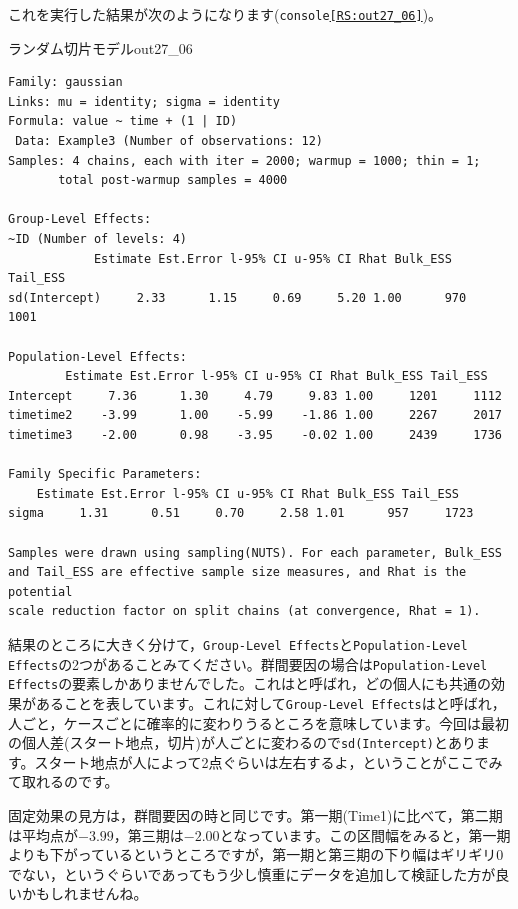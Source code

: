 \documentclass{ltjsarticle}
\begin{document}
これを実行した結果が次のようになります(\texttt{console\ref{RS:out27_06}})。
\begin{Rscreen}{ランダム切片モデル}{out27_06}
	\begin{verbatim}
Family: gaussian 
Links: mu = identity; sigma = identity 
Formula: value ~ time + (1 | ID) 
 Data: Example3 (Number of observations: 12) 
Samples: 4 chains, each with iter = 2000; warmup = 1000; thin = 1;
       total post-warmup samples = 4000

Group-Level Effects: 
~ID (Number of levels: 4) 
            Estimate Est.Error l-95% CI u-95% CI Rhat Bulk_ESS Tail_ESS
sd(Intercept)     2.33      1.15     0.69     5.20 1.00      970     1001

Population-Level Effects: 
        Estimate Est.Error l-95% CI u-95% CI Rhat Bulk_ESS Tail_ESS
Intercept     7.36      1.30     4.79     9.83 1.00     1201     1112
timetime2    -3.99      1.00    -5.99    -1.86 1.00     2267     2017
timetime3    -2.00      0.98    -3.95    -0.02 1.00     2439     1736

Family Specific Parameters: 
    Estimate Est.Error l-95% CI u-95% CI Rhat Bulk_ESS Tail_ESS
sigma     1.31      0.51     0.70     2.58 1.01      957     1723

Samples were drawn using sampling(NUTS). For each parameter, Bulk_ESS
and Tail_ESS are effective sample size measures, and Rhat is the potential
scale reduction factor on split chains (at convergence, Rhat = 1).
\end{verbatim}
\end{Rscreen}
結果のところに大きく分けて，\texttt{Group-Level Effects}と\texttt{Population-Level Effects}の2つがあることみてください。群間要因の場合は\texttt{Population-Level Effects}の要素しかありませんでした。これはと呼ばれ，どの個人にも共通の効果があることを表しています。これに対して\texttt{Group-Level Effects}はと呼ばれ，人ごと，ケースごとに確率的に変わりうるところを意味しています。今回は最初の個人差(スタート地点，切片)が人ごとに変わるので\texttt{sd(Intercept)}とあります。スタート地点が人によって2点ぐらいは左右するよ，ということがここでみて取れるのです。

固定効果の見方は，群間要因の時と同じです。第一期(Time1)に比べて，第二期は平均点が$-3.99$，第三期は$-2.00$となっています。この区間幅をみると，第一期よりも下がっているというところですが，第一期と第三期の下り幅はギリギリ0でない，というぐらいであってもう少し慎重にデータを追加して検証した方が良いかもしれませんね。\\
\end{document}
